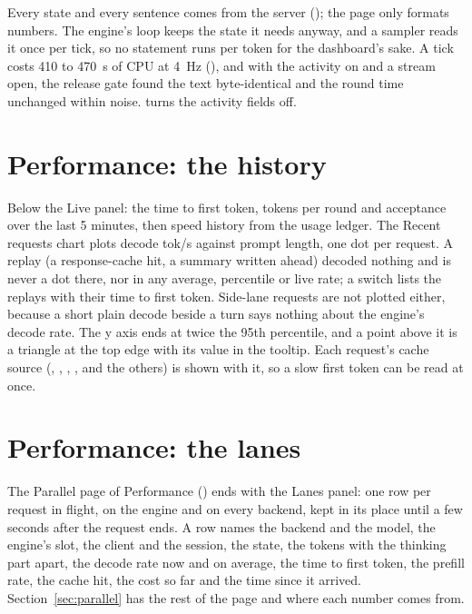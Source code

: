 Every state and every sentence comes from the server (); the page only formats numbers. The engine's loop keeps the state it needs anyway, and a sampler reads it once per tick, so no statement runs per token for the dashboard's sake. A tick costs 410 to 470~\textmu s of CPU at 4~Hz (\measured), and with the activity on and a stream open, the release gate found the text byte-identical and the round time unchanged within noise.  turns the activity fields off.

\section{Performance: the history}

Below the Live panel: the time to first token, tokens per round and acceptance over the last 5 minutes, then speed history from the usage ledger. The Recent requests chart plots decode tok/s against prompt length, one dot per request. A replay (a response-cache hit, a summary written ahead) decoded nothing and is never a dot there, nor in any average, percentile or live rate; a switch lists the replays with their time to first token. Side-lane requests are not plotted either, because a short plain decode beside a turn says nothing about the engine's decode rate. The y axis ends at twice the 95th percentile, and a point above it is a triangle at the top edge with its value in the tooltip. Each request's cache source (, , , ,  and the others) is shown with it, so a slow first token can be read at once.

\section{Performance: the lanes}\label{sec:dash-lanes}

The Parallel page of Performance () ends with the Lanes panel: one row per request in flight, on the engine and on every backend, kept in its place until a few seconds after the request ends. A row names the backend and the model, the engine's slot, the client and the session, the state, the tokens with the thinking part apart, the decode rate now and on average, the time to first token, the prefill rate, the cache hit, the cost so far and the time since it arrived. Section~\ref{sec:parallel} has the rest of the page and where each number comes from.

